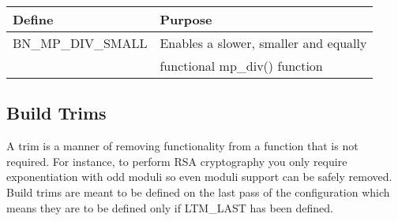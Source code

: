 \documentclass[synpaper]{book}
\begin{document}
\begin{small}
\begin{center}
\begin{tabular}{|l|l|}
\hline \textbf{Define} & \textbf{Purpose} \\
\hline BN\_MP\_DIV\_SMALL & Enables a slower, smaller and equally \\
                          & functional mp\_div() function \\
\hline
\end{tabular}
\end{center}
\end{small}

\subsection{Build Trims}
A trim is a manner of removing functionality from a function that is not required.  For instance, to perform
RSA cryptography you only require exponentiation with odd moduli so even moduli support can be safely removed.
Build trims are meant to be defined on the last pass of the configuration which means they are to be defined
only if LTM\_LAST has been defined.
\end{document}
